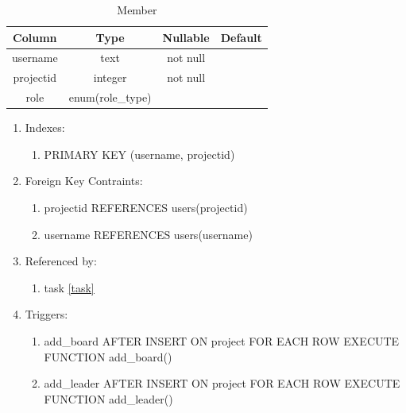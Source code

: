 \documentclass[conference,onecolumn]{IEEEtran}
\begin{document}
\begin{table}[htbp]
  \caption{Member}
  \begin{center}
    \begin{tabular}{|c|c|c|c|}
      \hline
      \textbf{Column} & \textbf{Type} & \textbf{Nullable} & \textbf{Default}\\
      \hline
      username & text & not null &\\
      projectid & integer & not null &\\
      role & enum(role\_type) &&\\
      \hline
    \end{tabular}
    \begin{enumerate}
    \item Indexes:
      \begin{enumerate}
      \item PRIMARY KEY (username, projectid)
      \end{enumerate}
    \item Foreign Key Contraints:
      \begin{enumerate}
      \item projectid REFERENCES users(projectid)
      \item username REFERENCES users(username)
      \end{enumerate}
    \item Referenced by:
      \begin{enumerate}
      \item task \ref{task}
      \end{enumerate}
    \item Triggers:
      \begin{enumerate}
        \item add\_board AFTER INSERT ON project FOR EACH ROW EXECUTE FUNCTION add\_board()
        \item add\_leader AFTER INSERT ON project FOR EACH ROW EXECUTE FUNCTION add\_leader()
      \end{enumerate}
    \end{enumerate}
    \label{member}
  \end{center}
\end{table}
\end{document}
